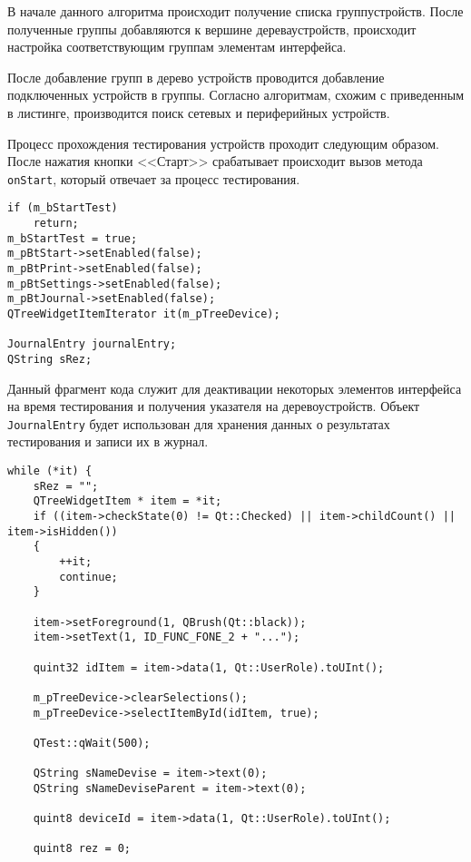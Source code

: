 В начале данного алгоритма происходит получение списка групп\break устройств. После полученные группы добавляются к вершине
дерева\break устройств, происходит настройка соответствующим группам элементам интерфейса.

После добавление групп в дерево устройств проводится добавление подключенных устройств в группы.
Согласно алгоритмам, схожим с приведенным в листинге, производится поиск сетевых и
периферийных устройств.

Процесс прохождения тестирования устройств проходит следующим образом. После нажатия кнопки <<Старт>> срабатывает
происходит вызов метода \texttt{onStart}, который отвечает за процесс тестирования.
\medskip
\begin{verbatim}
if (m_bStartTest)
	return;
m_bStartTest = true;
m_pBtStart->setEnabled(false);
m_pBtPrint->setEnabled(false);
m_pBtSettings->setEnabled(false);
m_pBtJournal->setEnabled(false);
QTreeWidgetItemIterator it(m_pTreeDevice);

JournalEntry journalEntry;
QString sRez;
\end{verbatim}
\medskip

Данный фрагмент кода служит для деактивации некоторых элементов интерфейса на время тестирования и получения указателя
на дерево\break устройств. Объект \texttt{JournalEntry} будет использован для хранения данных о результатах тестирования и
записи их в журнал.
\medskip
\begin{verbatim}
while (*it) {
	sRez = "";
	QTreeWidgetItem * item = *it;
	if ((item->checkState(0) != Qt::Checked) || item->childCount() || item->isHidden())
	{
		++it;
		continue;
	}

	item->setForeground(1, QBrush(Qt::black));
	item->setText(1, ID_FUNC_FONE_2 + "...");

	quint32 idItem = item->data(1, Qt::UserRole).toUInt();

	m_pTreeDevice->clearSelections();
	m_pTreeDevice->selectItemById(idItem, true);

	QTest::qWait(500);

	QString sNameDevise = item->text(0);
	QString sNameDeviseParent = item->text(0);

	quint8 deviceId = item->data(1, Qt::UserRole).toUInt();

	quint8 rez = 0;
\end{verbatim}
\medskip

